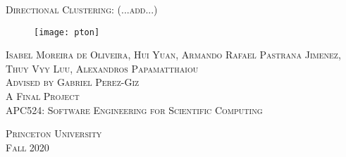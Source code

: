 \documentclass[11pt]{article}
\title{}
\author{}
\date{} %
\begin{document}
\begin{titlepage}
\centering
\vspace*{0mm}
\Large{\textsc{Directional Clustering: (...add...)}}
\vspace{30mm}

\begin{figure}[H]
\centering
\texttt{[image: pton]}
\end{figure}
\vspace{30mm}
\Large{\textsc{Isabel Moreira de Oliveira, Hui Yuan, Armando Rafael Pastrana Jimenez, Thuy Vyy Luu, Alexandros Papamatthaiou}}\\
\large{\textsc{Advised by Gabriel Perez-Giz}}\\
\vspace{8mm}
\large{\textsc
{A Final Project  \\ APC524: Software Engineering for Scientific Computing \\ }}

\large{\textsc{Princeton University \\Fall 2020\\}}

\end{titlepage}
\end{document}
